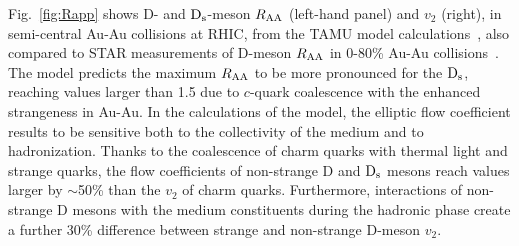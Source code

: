 Fig.~\ref{fig:Rapp} shows D- and ${\rm D_s}$-meson $R_{\rm AA}$ (left-hand panel)
and $v_2$ (right), in semi-central Au-Au collisions at 
RHIC, from the TAMU model calculations~\cite{He:2012df}, also
compared to STAR measurements of D-meson $R_{\rm AA}$ in 0-80\% Au-Au 
collisions~\cite{Zhang:2011uva}.
The model predicts the maximum $R_{\rm AA}$ to be more 
pronounced for the ${\rm D_s}$, reaching values larger than 1.5 due 
to $c$-quark coalescence with the enhanced strangeness in Au-Au.
In the calculations of the model, the elliptic flow coefficient results to be sensitive both 
to the collectivity of the medium and to hadronization. Thanks to the coalescence of charm quarks with 
thermal light and strange quarks, the flow coefficients of non-strange D and ${\rm D_s}$ mesons reach
values larger by $\sim$50\% than the $v_2$ of charm quarks. Furthermore, interactions of non-strange D mesons
with the medium constituents during the hadronic phase create a further 30\%
difference between strange and non-strange D-meson $v_2$.

